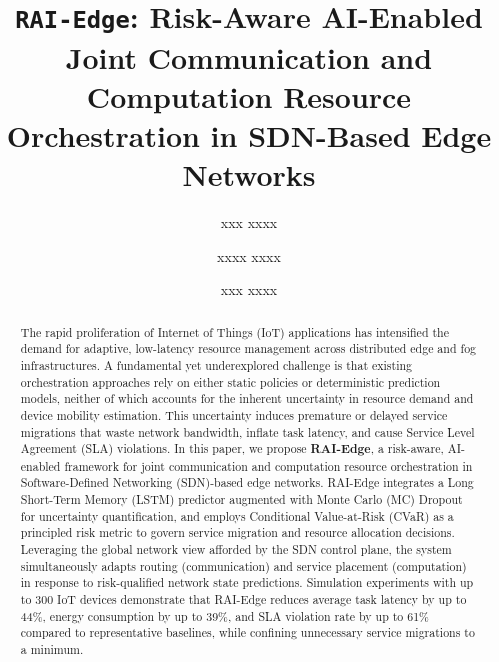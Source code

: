 \documentclass[conference]{IEEEtran}
\begin{document}
\title{\texttt{\textbf{RAI-Edge}}: Risk-Aware AI-Enabled Joint
Communication and Computation Resource Orchestration
in SDN-Based Edge Networks}

\author[1]{\rm xxx xxxx}
\author[2]{\rm xxxx xxxx}
\author[12]{\rm xxx xxxx}

\maketitle

\begin{abstract}
The rapid proliferation of Internet of Things (IoT) applications has
intensified the demand for adaptive, low-latency resource management
across distributed edge and fog infrastructures. A fundamental yet
underexplored challenge is that existing orchestration approaches rely
on either static policies or deterministic prediction models, neither of
which accounts for the inherent uncertainty in resource demand and device
mobility estimation. This uncertainty induces premature or delayed service
migrations that waste network bandwidth, inflate task latency, and cause
Service Level Agreement (SLA) violations. In this paper, we propose
\textbf{RAI-Edge}, a risk-aware, AI-enabled framework for joint
communication and computation resource orchestration in Software-Defined
Networking (SDN)-based edge networks. RAI-Edge integrates a Long
Short-Term Memory (LSTM) predictor augmented with Monte Carlo (MC)
Dropout for uncertainty quantification, and employs Conditional
Value-at-Risk (CVaR) as a principled risk metric to govern service
migration and resource allocation decisions. Leveraging the global
network view afforded by the SDN control plane, the system simultaneously
adapts routing (communication) and service placement (computation) in
response to risk-qualified network state predictions. Simulation
experiments with up to 300 IoT devices demonstrate that RAI-Edge reduces
average task latency by up to 44\%, energy consumption by up to 39\%,
and SLA violation rate by up to 61\% compared to representative
baselines, while confining unnecessary service migrations to a minimum.
\end{abstract}
\end{document}
